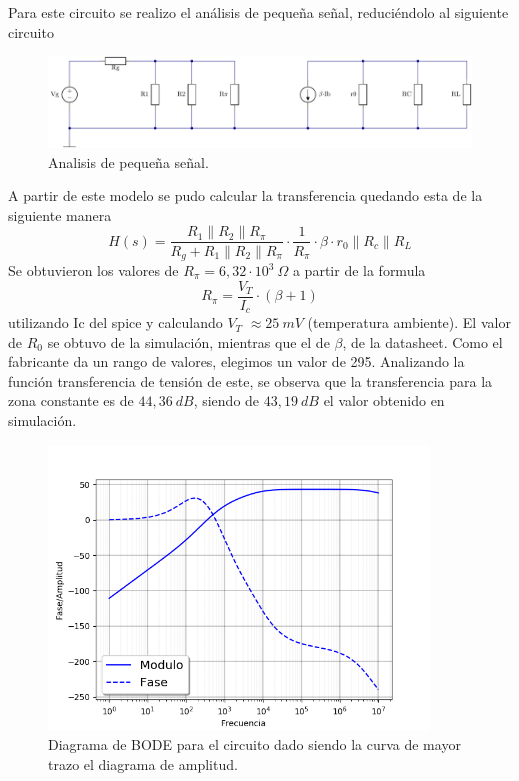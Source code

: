 \documentclass[a4paper]{article}
\begin{document}
Para este circuito se realizo el análisis de pequeña señal, reduciéndolo al siguiente circuito
\begin{figure}[H]
	\centering
	\includegraphics[width=1 \textwidth]{CircEq.PNG}	
	\caption{Analisis de pequeña señal.}
	\label{fig:littleSignal}
\end{figure}
A partir de este modelo se pudo calcular la transferencia quedando esta de la siguiente manera \[H(s)=\frac{R_1\parallel R_2\parallel R_\pi}{R_g+R_1\parallel R_2\parallel R_\pi}\cdot \frac{1}{R_\pi} \cdot \beta \cdot r_0 \parallel R_c \parallel R_L  \]
Se obtuvieron los valores de $R_\pi = 6,32 \cdot 10^{3} \ \Omega$ a partir de la formula \[R_\pi = \frac{V_T}{I_c}\cdot (\beta +1) \] utilizando Ic del spice y calculando $V_T$ $\approx 25 \ mV$ (temperatura ambiente).
El valor de $R_0$ se obtuvo de la simulación, mientras que el de $\beta$, de la datasheet. Como el fabricante da un rango de valores, elegimos un valor de 295. 
Analizando la función transferencia de tensión de este, se observa que la transferencia para la zona constante es de $44,36 \ dB$, siendo de $43,19 \ dB$ el valor obtenido en simulación.

\begin{figure}[H]
	\centering
	\includegraphics[width=0.9\textwidth]{RtaF2.png}	
	\caption{Diagrama de BODE para el circuito dado siendo la curva de mayor trazo el diagrama de amplitud.}
	\label{fig:bode}
\end{figure}
\end{document}
